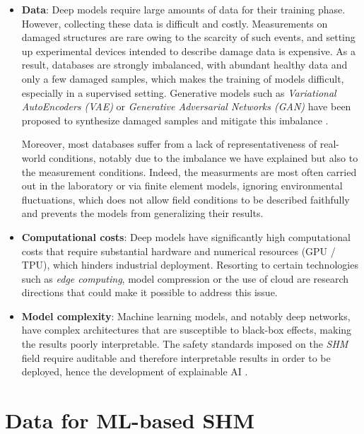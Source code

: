 \documentclass[12pt]{article}
\begin{document}
\begin{itemize}[itemsep=8pt]
    
    \item \textbf{Data}: Deep models require large amounts of data for their training phase. However, collecting these data is difficult and costly. Measurements on damaged structures are rare owing to the scarcity of such events, and setting up experimental devices intended to describe damage data is expensive. As a result, databases are strongly imbalanced, with abundant healthy data and only a few damaged samples, which makes the training of models difficult, especially in a supervised setting. Generative models such as \textit{Variational AutoEncoders (VAE)} or \textit{Generative Adversarial Networks (GAN)} have been proposed to synthesize damaged samples and mitigate this imbalance \cite{s25196136}.
    
    Moreover, most databases suffer from a lack of representativeness of real-world conditions, notably due to the imbalance we have explained but also to the measurement conditions. Indeed, the measurments are most often carried out in the laboratory or via finite element models, ignoring environmental fluctuations, which does not allow field conditions to be described faithfully and prevents the models from generalizing their results.
    
    \item \textbf{Computational costs}: Deep models have significantly high computational costs that require substantial hardware and numerical resources (GPU / TPU), which hinders industrial deployment. Resorting to certain technologies such as \textit{edge computing}, model compression or the use of cloud are research directions that could make it possible to address this issue.
 
    \item \textbf{Model complexity}: Machine learning models, and notably deep networks, have complex architectures that are susceptible to black-box effects, making the results poorly interpretable. The safety standards imposed on the \textit{SHM} field require auditable and therefore interpretable results in order to be deployed, hence the development of explainable AI \cite{Khatir2025, SPENCER2025100203}.  
 
\end{itemize}

\section{Data for ML-based SHM}
 
\end{document}

